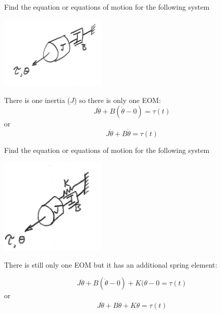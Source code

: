 \begin{ExampleSmall}
Find the equation or equations of motion for the following system 

\includegraphics[width=2.0in]{figs03/00741.png}

There is one inertia ($J$) so there is only one EOM:
\[
J\ddot{\theta} + B(\dot{\theta}-0) = \tau(t)
\]
or
\[
J\ddot{\theta} + B\dot{\theta} = \tau(t)
\]
\end{ExampleSmall}


\begin{ExampleSmall}
Find the equation or equations of motion for the following system 

\includegraphics[width=2.0in]{figs03/00742.png}

There is still only one EOM but it has an additional spring element:

\[
J\ddot{\theta} + B(\dot{\theta}-0) + K(\theta-0 = \tau(t)
\]
or
\[
J\ddot{\theta} + B\dot{\theta} + K\theta = \tau(t)
\]

\end{ExampleSmall}


